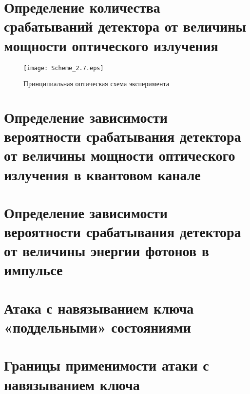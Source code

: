 

\section{Определение количества срабатываний детектора от величины мощности оптического излучения} \label{sec:ch2/sec7}


 \begin{figure}[ht]
  \centering
  \texttt{[image: Scheme\_2.7.eps]}
  \caption{Принципиальная оптическая схема эксперимента}
  \label{fig:Scheme_2.7}
\end{figure}





\section{Определение зависимости вероятности срабатывания детектора от величины мощности оптического излучения в квантовом канале} \label{sec:ch2/sec8}






\section{Определение зависимости вероятности срабатывания детектора от величины энергии фотонов в импульсе} \label{sec:ch2/sec9}


\section{Атака с навязыванием ключа «поддельными» состояниями} \label{sec:ch2/sec10}


\section{Границы применимости атаки с навязыванием ключа} \label{sec:ch2/sec11}





